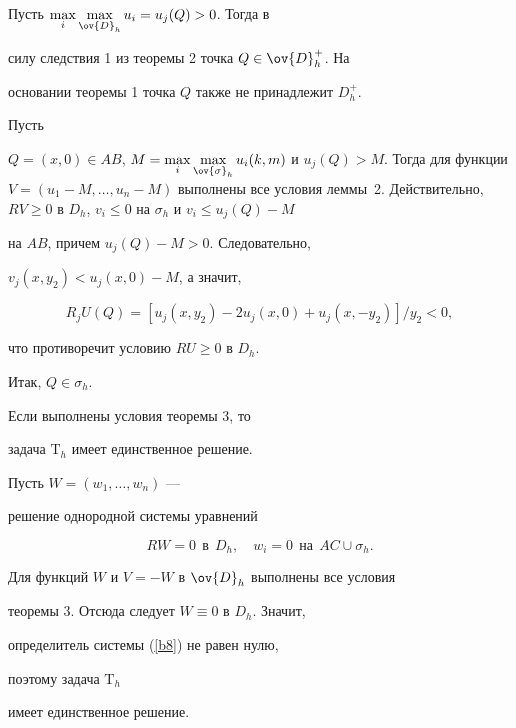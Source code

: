 \begin{pf}


Пусть $\max\limits_{i}\max\limits_{\ov{D}_h} u_i = u_j(Q)>0$. Тогда в


силу следствия 1 из теоремы 2 точка $Q\in \ov{D}^+_h$. На


основании теоремы 1 точка $Q$ также не принадлежит $D_h^+$.





Пусть


$Q = (x,0) \in AB$, $M=\max\limits_{i}\max\limits_{\ov{\sigma}_h}


u_i(k,m)$ и $u_j(Q)>M$. Тогда для функции $V=(u_1-M,


\dotsc, u_n-M)$ выполнены все условия леммы~2. Действительно, $RV


\geq 0$ в $D_h$, $v_i\leq 0$ на $\sigma_h$ и $v_i\leq u_j(Q) - M$


на $AB$, причем $u_j(Q) - M > 0$. Следовательно,


$v_j(x,y_2)<u_j(x,0) - M$, а значит,


$$


R_jU(Q) = [u_j(x,y_2) - 2u_j(x,0) + u_j(x,-y_2)]/y_2 < 0,


$$


что противоречит условию $RU \geq 0$ в $D_h$.


Итак, $Q \in \sigma_h$.


\end{pf}








\begin{cor}


Если выполнены условия теоремы 3, то


задача $\mathrm T_h$ имеет единственное решение.


\end{cor}








\begin{pf}


Пусть $W=(w_1,\dotsc,w_n)$ ---


решение однородной системы уравнений


$$


RW=0\ \ \text{в}\ \ D_h,\quad w_i=0\ \ \text{на}\ \ AC\cup \sigma_h.


$$


Для функций $W$ и $V=-W$ в $\ov{D}_h$ выполнены все условия


теоремы 3. Отсюда следует $W\equiv 0$ в $D_h$. Значит,


определитель системы (\ref{b8}) не равен нулю,


поэтому задача $\mathrm T_h$ 


имеет единственное решение.


\end{pf}








